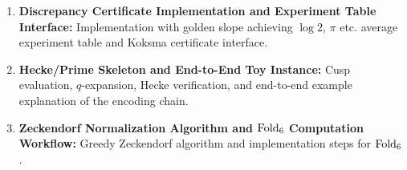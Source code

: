\begin{enumerate}
  \item \textbf{Discrepancy Certificate Implementation and Experiment Table Interface:} Implementation with golden slope achieving $\log 2$, $\pi$ etc. average experiment table and Koksma certificate interface.
  \item \textbf{Hecke/Prime Skeleton and End-to-End Toy Instance:} Cusp evaluation, $q$-expansion, Hecke verification, and end-to-end example explanation of the encoding chain.
  \item \textbf{Zeckendorf Normalization Algorithm and $\mathrm{Fold}_6$ Computation Workflow:} Greedy Zeckendorf algorithm and implementation steps for $\mathrm{Fold}_6$.
\end{enumerate}
